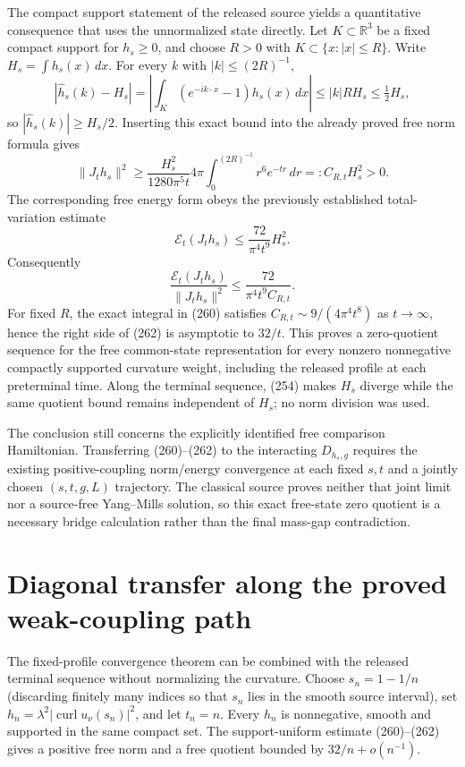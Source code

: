 \documentclass[11pt]{article}
\begin{document}
The compact support statement of the released source yields a quantitative consequence that uses the unnormalized state directly.  Let $K\subset\mathbb R^3$ be a fixed compact support for $h_s\ge0$, and choose $R>0$ with $K\subset\{x:|x|\le R\}$.  Write $H_s=\int h_s(x)\,dx$.  For every $k$ with $|k|\le(2R)^{-1}$,
\[
 |\widehat h_s(k)-H_s|
 =\left|\int_K(e^{-ik\cdot x}-1)h_s(x)\,dx\right|
 \le |k|R H_s\le \tfrac12H_s,
\]
so $|\widehat h_s(k)|\ge H_s/2$.  Inserting this exact bound into the already proved free norm formula gives
\[
 \|J_t h_s\|^2
 \ge \frac{H_s^2}{1280\pi^5t}
       4\pi\int_0^{(2R)^{-1}}r^6e^{-tr}\,dr
 =:C_{R,t}H_s^2>0.\tag{260}
\]
The corresponding free energy form obeys the previously established total-variation estimate
\[
 \mathcal E_t(J_t h_s)\le \frac{72}{\pi^4t^9}H_s^2.\tag{261}
\]
Consequently
\[
 \frac{\mathcal E_t(J_t h_s)}{\|J_t h_s\|^2}
 \le \frac{72}{\pi^4t^9C_{R,t}}.
 \tag{262}
\]
For fixed $R$, the exact integral in (260) satisfies $C_{R,t}\sim9/(4\pi^4t^8)$ as $t\to\infty$, hence the right side of (262) is asymptotic to $32/t$.  This proves a zero-quotient sequence for the free common-state representation for every nonzero nonnegative compactly supported curvature weight, including the released profile at each preterminal time.  Along the terminal sequence, (254) makes $H_s$ diverge while the same quotient bound remains independent of $H_s$; no norm division was used.

The conclusion still concerns the explicitly identified free comparison Hamiltonian.  Transferring (260)--(262) to the interacting $D_{h_s,g}$ requires the existing positive-coupling norm/energy convergence at each fixed $s,t$ and a jointly chosen $(s,t,g,L)$ trajectory.  The classical source proves neither that joint limit nor a source-free Yang--Mills solution, so this exact free-state zero quotient is a necessary bridge calculation rather than the final mass-gap contradiction.

\section{Diagonal transfer along the proved weak-coupling path}
\label{sec:diagonal-profile-transfer}

The fixed-profile convergence theorem can be combined with the released terminal sequence without normalizing the curvature.  Choose $s_n=1-1/n$ (discarding finitely many indices so that $s_n$ lies in the smooth source interval), set $h_n=\lambda^2|\operatorname{curl}u_\nu(s_n)|^2$, and let $t_n=n$.  Every $h_n$ is nonnegative, smooth and supported in the same compact set.  The support-uniform estimate (260)--(262) gives a positive free norm and a free quotient bounded by $32/n+o(n^{-1})$.
\end{document}
